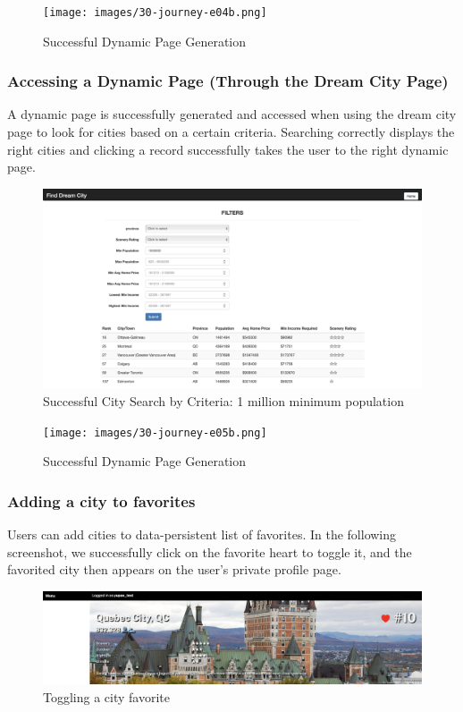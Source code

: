 \documentclass[12pt, letterpaper]{article}
\begin{document}
 \begin{figure}[htbp]
	\centering
	\texttt{[image: images/30-journey-e04b.png]}
	\caption{Successful Dynamic Page Generation}
 \end{figure}

\newpage
 \subsubsection*{Accessing a Dynamic Page (Through the Dream City Page)}
 A dynamic page is successfully generated and accessed when using the dream city page to look for cities based on a certain criteria. Searching correctly displays the right cities and clicking a record successfully takes the user to the right dynamic page.

 \begin{figure}[htbp]
	\centering
	\includegraphics[width=5in]{images/30-journey-e05a.png}
	\caption{Successful City Search by Criteria: 1 million minimum population}
 \end{figure}

 \begin{figure}[htbp]
	\centering
	\texttt{[image: images/30-journey-e05b.png]}
	\caption{Successful Dynamic Page Generation}
 \end{figure}

 \newpage
 \subsubsection*{Adding a city to favorites}
Users can add cities to data-persistent list of favorites. In the following screenshot, we successfully click on the favorite heart to toggle it, and the favorited city then appears on the user's private profile page.

\begin{figure}[htbp]
	\centering
	\includegraphics[width=\textwidth]{images/30-journey-e06a.png}
	\caption{Toggling a city favorite}
 \end{figure}
\end{document}
